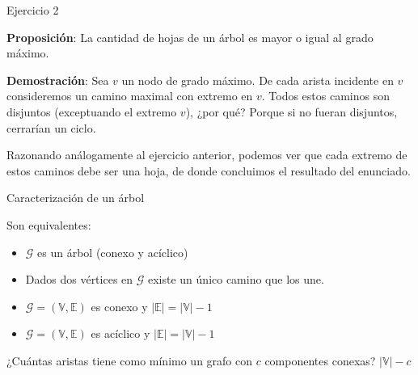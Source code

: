 \documentclass[10pt, aspectratio=169]{beamer}
\newcommand \anchoPagina{1.0} %
\begin{document}
\begin{frame}{Ejercicio 2}
	\begin{minipage}{\anchoPagina \textwidth}
		\textbf{Proposici\'on}: La cantidad de hojas de un \'arbol es mayor o igual al grado m\'aximo.	
		
		\pause
		
		\textbf{Demostraci\'on}: Sea $v$ un nodo de grado m\'aximo. De cada arista incidente en $v$ consideremos un camino maximal con extremo en $v$. Todos estos caminos son disjuntos (exceptuando el extremo $v$), ¿por qu\'e? \pause Porque si no fueran disjuntos, cerrar\'ian un ciclo.
		
		Razonando an\'alogamente al ejercicio anterior, podemos ver que cada extremo de estos caminos debe ser una hoja, de donde concluimos el resultado del enunciado.     
		
	\end{minipage}
	
\end{frame}



\begin{frame}{Caracterizaci\'on de un \'arbol}
	\begin{minipage}{\anchoPagina \textwidth}
	
		Son equivalentes:
		\begin{itemize}
			\item $\mathcal{G}$ es un \'arbol (conexo y ac\'iclico)
			\item Dados dos v\'ertices en $\mathcal{G}$ existe un \'unico camino que los une.
			\item $\mathcal{G} = (\mathbb{V},\mathbb{E})$ es conexo y $|\mathbb{E}| = |\mathbb{V}| - 1$
			\item $\mathcal{G} = (\mathbb{V},\mathbb{E})$ es ac\'iclico y $|\mathbb{E}| = |\mathbb{V}| - 1$
		\end{itemize}
		\pause
		¿Cu\'antas aristas tiene como m\'inimo un grafo con $c$ componentes conexas?
		\pause $|\mathbb{V}| - c$
	\end{minipage} 
\end{frame}
\end{document}
